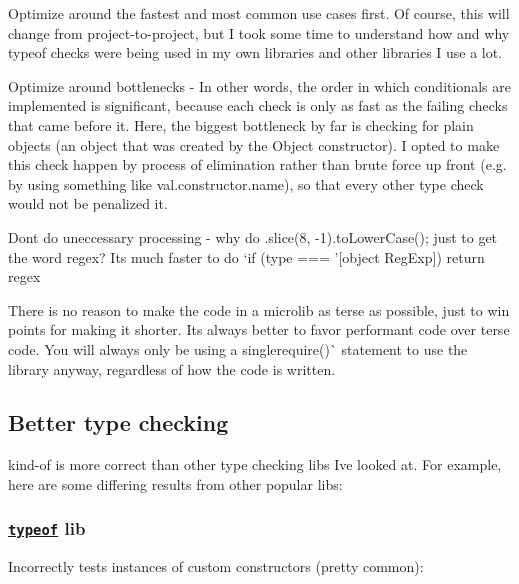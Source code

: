 \begin{DoxyEnumerate}
\item Optimize around the fastest and most common use cases first. Of course, this will change from project-\/to-\/project, but I took some time to understand how and why {\ttfamily typeof} checks were being used in my own libraries and other libraries I use a lot.
\item Optimize around bottlenecks -\/ In other words, the order in which conditionals are implemented is significant, because each check is only as fast as the failing checks that came before it. Here, the biggest bottleneck by far is checking for plain objects (an object that was created by the {\ttfamily Object} constructor). I opted to make this check happen by process of elimination rather than brute force up front (e.\+g. by using something like {\ttfamily val.\+constructor.\+name}), so that every other type check would not be penalized it.
\item Don\textquotesingle{}t do uneccessary processing -\/ why do {\ttfamily .slice(8, -\/1).to\+Lower\+Case();} just to get the word {\ttfamily regex}? It\textquotesingle{}s much faster to do `if (type === '\mbox{[}object Reg\+Exp\mbox{]}\textquotesingle{}) return \textquotesingle{}regex\textquotesingle{}{\ttfamily }
\item {\ttfamily There is no reason to make the code in a microlib as terse as possible, just to win points for making it shorter. It\textquotesingle{}s always better to favor performant code over terse code. You will always only be using a single}require()\`{} statement to use the library anyway, regardless of how the code is written.
\end{DoxyEnumerate}

\subsection*{Better type checking}

kind-\/of is more correct than other type checking libs I\textquotesingle{}ve looked at. For example, here are some differing results from other popular libs\+:

\subsubsection*{\href{https://github.com/CodingFu/typeof}{\tt typeof} lib}

Incorrectly tests instances of custom constructors (pretty common)\+:


